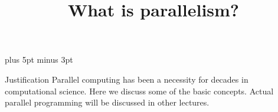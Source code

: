 \documentclass[11pt]{beamer}
\begin{document}
\parskip=10pt plus 5pt minus 3pt

\title{What is parallelism?}
\author{\hpcteachers}
\date{\hpcsemester}

\begin{frame}
  \titlepage
\end{frame}

\begin{frame}{Justification}
  Parallel computing has been a necessity for decades in computational science.
  Here we discuss some of the basic concepts.
  Actual parallel programming will be discussed in other lectures.
\end{frame}


\end{document}

